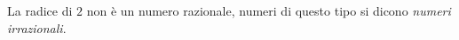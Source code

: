 % 
% 
% 
% 

La radice di \(2\) non è un numero razionale, numeri di questo tipo si 
dicono \emph{numeri irrazionali}.

